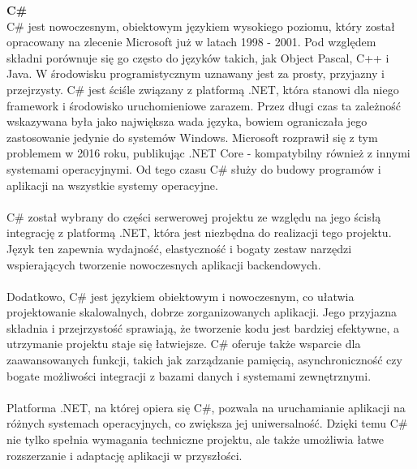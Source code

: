 \documentclass[12pt,a4paper]{article}
\begin{document}
\noindent \textbf{C\#}\\
C\# jest nowoczesnym, obiektowym językiem wysokiego poziomu, który został opracowany na zlecenie Microsoft już w latach 1998 - 2001. Pod względem składni porównuje się go często do języków takich, jak Object Pascal, C++ i Java. W środowisku programistycznym uznawany jest za prosty, przyjazny i przejrzysty. C\# jest ściśle związany z platformą .NET, która stanowi dla niego framework i środowisko uruchomieniowe zarazem. Przez długi czas ta zależność wskazywana była jako największa wada języka, bowiem ograniczała jego zastosowanie jedynie do systemów Windows. Microsoft rozprawił się z tym problemem w 2016 roku, publikując .NET Core - kompatybilny również z innymi systemami operacyjnymi. Od tego czasu C\# służy do budowy programów i aplikacji na wszystkie systemy operacyjne.
\\\\
C\# został wybrany do części serwerowej projektu ze względu na jego ścisłą integrację z platformą .NET, która jest niezbędna do realizacji tego projektu. Język ten zapewnia wydajność, elastyczność i bogaty zestaw narzędzi wspierających tworzenie nowoczesnych aplikacji backendowych.
\\\\
Dodatkowo, C\# jest językiem obiektowym i nowoczesnym, co ułatwia projektowanie skalowalnych, dobrze zorganizowanych aplikacji. Jego przyjazna składnia i przejrzystość sprawiają, że tworzenie kodu jest bardziej efektywne, a utrzymanie projektu staje się łatwiejsze. C\# oferuje także wsparcie dla zaawansowanych funkcji, takich jak zarządzanie pamięcią, asynchroniczność czy bogate możliwości integracji z bazami danych i systemami zewnętrznymi.
\\\\
Platforma .NET, na której opiera się C\#, pozwala na uruchamianie aplikacji na różnych systemach operacyjnych, co zwiększa jej uniwersalność. Dzięki temu C\# nie tylko spełnia wymagania techniczne projektu, ale także umożliwia łatwe rozszerzanie i adaptację aplikacji w przyszłości.
\\\\
\end{document}
